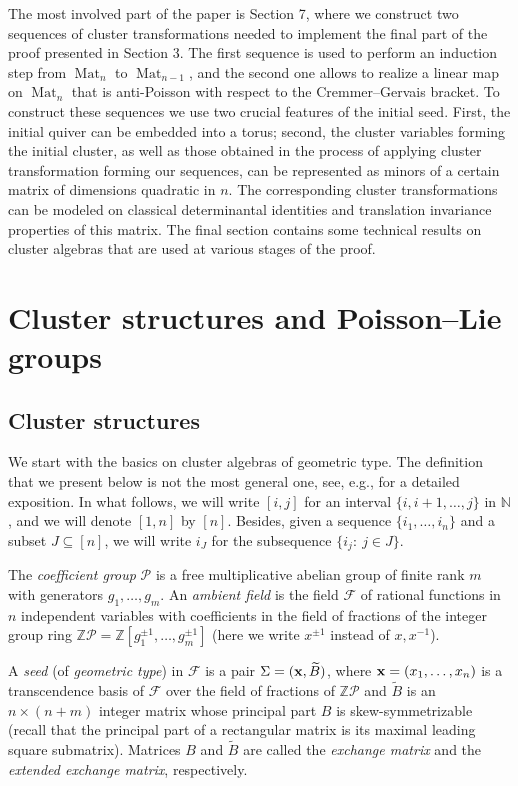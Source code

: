 \documentclass{amsart}
\theoremstyle{definition}
\theoremstyle{remark}
\numberwithin{equation}{section}
\numberwithin{theorem}{section}
\begin{document}
 The most involved part of the paper is Section 7, where we construct two sequences of cluster transformations needed to implement the final part of the proof presented in Section 3. The first sequence is used to perform an induction step from ${\operatorname{Mat}}_n$ to ${\operatorname{Mat}}_{n-1}$, and the second one allows to realize a linear map on ${\operatorname{Mat}}_n$ that is anti-Poisson with respect to the Cremmer--Gervais bracket. To construct these sequences we use two
 crucial features of the initial seed.  First, the initial quiver can be embedded into a torus; second, the cluster variables forming the initial cluster, as well as those obtained in the process of applying cluster transformation forming our sequences, can be represented as minors of a certain
 matrix of dimensions quadratic in $n$. The corresponding cluster transformations can be modeled on classical determinantal identities and translation invariance properties of this matrix. The final section contains some technical results on cluster algebras that are used at various stages of the proof.
 

\section{Cluster structures and Poisson--Lie groups}
\label{SecPrel}

\subsection{Cluster structures}
We start with the basics on cluster algebras of geometric type. The definition that we present
below is not the most general one, see, e.g.,
\cite{FZ2, CAIII} for a detailed exposition. In what follows, we will write $[i,j]$ for an interval
$\{i, i+1, \ldots , j\}$ in $\mathbb{N}$, and we will denote $[1, n]$ by $[n]$. Besides, given
a sequence $\{i_1,\dots,i_n\}$ and a subset $J\subseteq[n]$, we will write $i_J$ for the subsequence
$\{i_j{{:\ }} j\in J\}$.
 
The {\em coefficient group\/} ${{\mathcal P}}$ is a free multiplicative abelian
group of finite rank $m$ with generators $g_1,\dots, g_m$.
An {\em ambient field\/}  is
the field ${{\mathcal F}}$ of rational functions in $n$ independent variables with
coefficients in the field of fractions of the integer group ring
${{\mathbb Z}}{{\mathcal P}}={{\mathbb Z}}[g_1^{\pm1},\dots,g_m^{\pm1}]$ (here we write
$x^{\pm1}$ instead of $x,x^{-1}$).

A {\em seed\/} (of {\em geometric type\/}) in ${{\mathcal F}}$ is a pair
$\Sigma=({{\bf x}},\widetilde{B})$,
where ${{\bf x}}=(x_1,\dots,x_n)$ is a transcendence basis of ${{\mathcal F}}$ over the field of
fractions of ${{\mathbb Z}}{{\mathcal P}}$ and $\widetilde{B}$ is an $n\times(n+m)$ integer matrix
whose principal part $B$ is skew-symmetrizable (recall that the principal part of a rectangular matrix  
is its maximal leading square submatrix). Matrices $B$ and ${{\widetilde{B}}}$ are 
called the {\it exchange matrix\/} and the {\it extended exchange matrix}, respectively.
\end{document}

